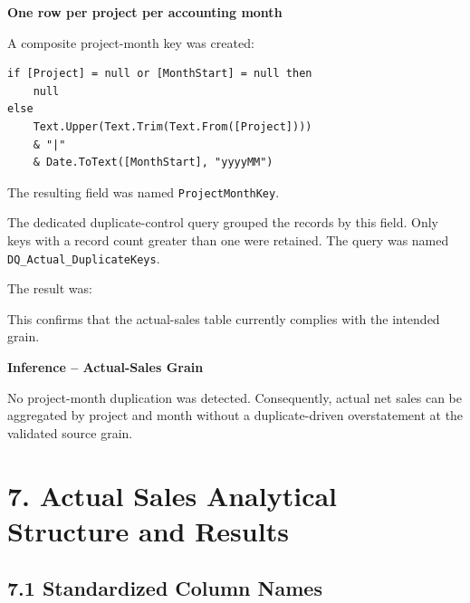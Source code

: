 \documentclass[11pt,a4paper]{article}
\begin{document}
\begin{center}
\textbf{One row per project per accounting month}
\end{center}

A composite project-month key was created:

\begin{lstlisting}[style=powerquery]
if [Project] = null or [MonthStart] = null then
    null
else
    Text.Upper(Text.Trim(Text.From([Project])))
    & "|"
    & Date.ToText([MonthStart], "yyyyMM")
\end{lstlisting}

The resulting field was named \texttt{ProjectMonthKey}.

The dedicated duplicate-control query grouped the records by this field.
Only keys with a record count greater than one were retained. The query
was named \texttt{DQ\_Actual\_DuplicateKeys}.

The result was:

\begin{center}
\textbf{\color{SuccessGreen}{0 duplicate project-month keys}}
\end{center}

This confirms that the actual-sales table currently complies with the
intended grain.

\begin{inferencebox}

\textbf{Inference -- Actual-Sales Grain}

No project-month duplication was detected. Consequently, actual net sales can
be aggregated by project and month without a duplicate-driven overstatement at
the validated source grain.

\end{inferencebox}


\section{7. Actual Sales Analytical Structure and Results}

\subsection{7.1 Standardized Column Names}
\end{document}

